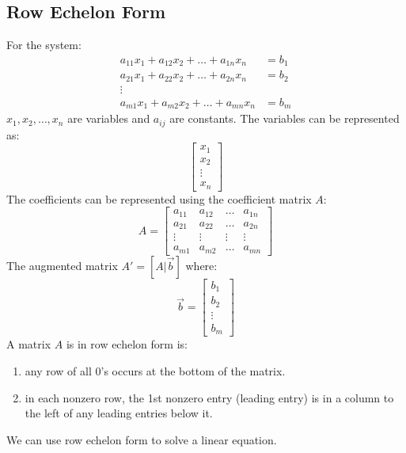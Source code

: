 \documentclass{math}
\begin{document}
\subsection*{Row Echelon Form}
For the system:
\begin{align*}
  a_{11}x_1+a_{12}x_2+\dots+a_{1n}x_n &= b_1 \\
  a_{21}x_1+a_{22}x_2+\dots+a_{2n}x_n &= b_2 \\
  \vdots \\
  a_{m1}x_1+a_{m2}x_2+\dots+a_{mn}x_n &= b_m
\end{align*}
\( x_1,x_2,\dots,x_n \) are variables and \( a_{ij} \) are constants. The
variables can be represented as:
\[ \begin{bmatrix} x_1 \\ x_2 \\ \vdots \\ x_n \end{bmatrix} \]
The coefficients can be represented using the coefficient matrix \( A \):
\[ A = \begin{bmatrix}
  a_{11} & a_{12} & \dots & a_{1n} \\
  a_{21} & a_{22} & \dots & a_{2n} \\
  \vdots & \vdots & \vdots & \vdots \\
  a_{m1} & a_{m2} & \dots & a_{mn}
\end{bmatrix} \]
The augmented matrix \( A' = [A|\vec{b}] \) where:
\[ \vec{b} = \begin{bmatrix} b_1 \\ b_2 \\ \vdots \\ b_m \end{bmatrix} \]
A matrix \( A \) is in row echelon form is:
\begin{enumerate}
  \item any row of all 0's occurs at the bottom of the matrix.
  \item in each nonzero row, the 1st nonzero entry (leading entry) is in a
    column to the left of any leading entries below it.
\end{enumerate}
We can use row echelon form to solve a linear equation.
\end{document}
